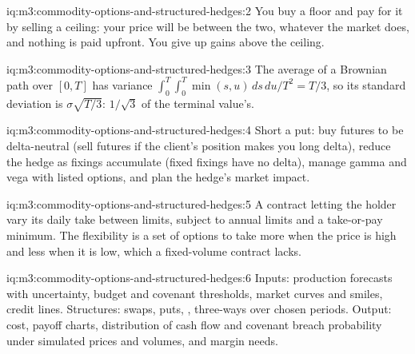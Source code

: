 \begin{solution}{iq:m3:commodity-options-and-structured-hedges:2}
You buy a floor and pay for it by selling a ceiling: your price will be between the two, whatever the
market does, and nothing is paid upfront. You give up gains above the ceiling.
\end{solution}

\begin{solution}{iq:m3:commodity-options-and-structured-hedges:3}
The average of a Brownian path over $[0,T]$ has variance $\int_0^T\!\int_0^T \min(s,u)\,ds\,du/T^2 = T/3$,
so its standard deviation is $\sigma\sqrt{T/3}$: $1/\sqrt3$ of the terminal value's.
\end{solution}

\begin{solution}{iq:m3:commodity-options-and-structured-hedges:4}
Short a put: buy futures to be delta-neutral (sell futures if the client's position makes you long delta),
reduce the hedge as fixings accumulate (fixed fixings have no delta), manage gamma and vega with listed
options, and plan the hedge's market impact.
\end{solution}

\begin{solution}{iq:m3:commodity-options-and-structured-hedges:5}
A contract letting the holder vary its daily take between limits, subject to annual limits and a
take-or-pay minimum. The flexibility is a set of options to take more when the price is high and less when
it is low, which a fixed-volume contract lacks.
\end{solution}

\begin{solution}{iq:m3:commodity-options-and-structured-hedges:6}
Inputs: production forecasts with uncertainty, budget and covenant thresholds, market curves and smiles,
credit lines. Structures: swaps, puts, , three-ways over chosen periods. Output: cost, payoff
charts, distribution of cash flow and covenant breach probability under simulated prices and volumes, and
margin needs.
\end{solution}
